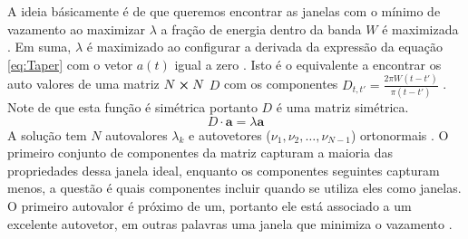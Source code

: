 A ideia b\'asicamente \'e de que queremos encontrar as janelas com o m\'inimo de vazamento ao maximizar $\lambda$ a fra\c{c}\~ao de energia dentro da banda $W$ \'e maximizada \cite{PMTM}.
Em suma, $\lambda$ \'e maximizado ao configurar a derivada da express\~ao da equa\c{c}\~ao \ref{eq:Taper} com o vetor $a(t)$ igual a zero \cite{PMTM}.
Isto \'e o equivalente a encontrar os auto valores de uma matriz $N\cross N$ $D$ com os componentes $D_{t,t'}=\frac{2\pi W(t-t')}{\pi(t-t')}$ \cite{PMTM}.
Note de que esta fun\c{c}\~ao \'e sim\'etrica portanto $D$ \'e uma matriz sim\'etrica.
\begin{equation*}
D \cdot \textbf{a} = \lambda \textbf{a}
\end{equation*}
A solu\c{c}\~ao  tem $N$ autovalores $\lambda_k$ e autovetores ($\nu_{1},\nu_{2},\ldots,\nu_{N-1}$) ortonormais  \cite{PMTM}.
O primeiro conjunto de componentes da matriz capturam a maioria das propriedades dessa janela ideal, enquanto os componentes seguintes capturam menos, a quest\~ao \'e quais componentes incluir quando se utiliza eles como janelas\cite{PMTM}. O primeiro autovalor \'e  pr\'oximo de um, portanto ele est\'a associado a um excelente autovetor, em outras palavras uma janela que minimiza o vazamento \cite{PMTM}.